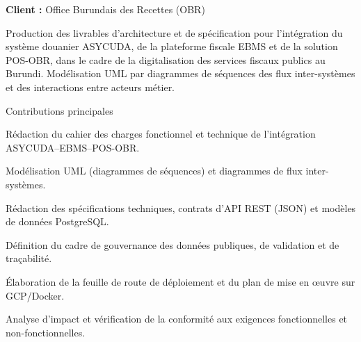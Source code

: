 \newpage
{}

\cvgroupreset

\begin{cvgroup}

\begin{cvmetadata}
\textbf{Client :} Office Burundais des Recettes (OBR)
\end{cvmetadata}

\begin{cvprojectsummary}
Production des livrables d'architecture et de spécification pour l'intégration du système douanier ASYCUDA, de la plateforme fiscale EBMS et de la solution POS-OBR, dans le cadre de la digitalisation des services fiscaux publics au Burundi. Modélisation UML par diagrammes de séquences des flux inter-systèmes et des interactions entre acteurs métier.
\end{cvprojectsummary}

\begin{cvdetailslist}{Contributions principales}
  \item {Rédaction du cahier des charges fonctionnel et technique de l'intégration ASYCUDA–EBMS–POS-OBR.}
  \item {Modélisation UML (diagrammes de séquences) et diagrammes de flux inter-systèmes.}
  \item {Rédaction des spécifications techniques, contrats d'API REST (JSON) et modèles de données PostgreSQL.}
  \item {Définition du cadre de gouvernance des données publiques, de validation et de traçabilité.}
  \item {Élaboration de la feuille de route de déploiement et du plan de mise en œuvre sur GCP/Docker.}
  \item {Analyse d'impact et vérification de la conformité aux exigences fonctionnelles et non-fonctionnelles.}
\end{cvdetailslist}


\end{cvgroup}

